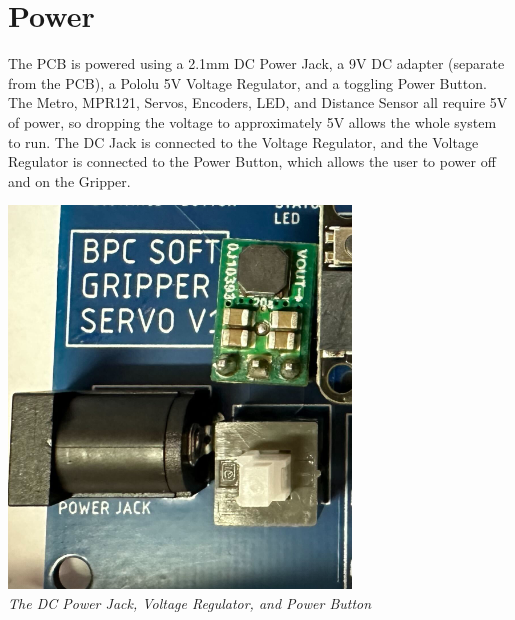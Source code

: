 \documentclass{article}
\begin{document}
\section{Power}
The PCB is powered using a 2.1mm DC Power Jack, a 9V DC adapter (separate from the PCB), a Pololu 5V Voltage Regulator, and a toggling Power Button. The Metro, MPR121, Servos, Encoders, LED, and Distance Sensor all require 5V of power, so dropping the voltage to approximately 5V allows the whole system to run. The DC Jack is connected to the Voltage Regulator, and the Voltage Regulator is connected to the Power Button, which allows the user to power off and on the Gripper. \\
\begin{center}
    \includegraphics[scale=.5]{Images/PowerSection.png}
    \\[1ex] %
    \textit{The DC Power Jack, Voltage Regulator, and Power Button}
\end{center}
\end{document}
